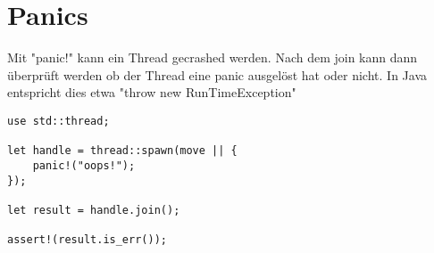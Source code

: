 \section{Panics}

Mit "panic!" kann ein Thread gecrashed werden.
Nach dem join kann dann überprüft werden ob der Thread eine panic ausgelöst hat oder nicht. In Java entspricht dies etwa "throw new RunTimeException"

\begin{lstlisting}
use std::thread;

let handle = thread::spawn(move || {
	panic!("oops!");
});

let result = handle.join();

assert!(result.is_err());
\end{lstlisting}